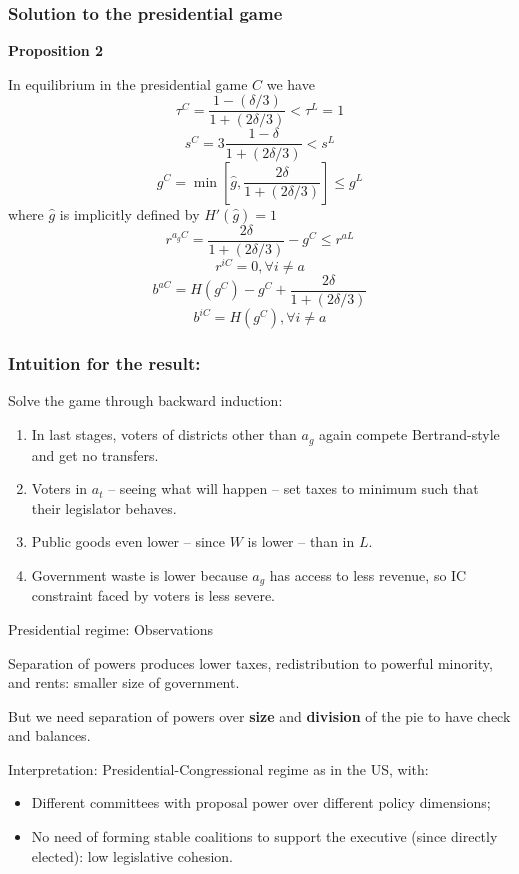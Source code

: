 \documentclass[11pt,aspectratio=169]{beamer}
\begin{document}
\begin{frame}
\frametitle{Solution to the presidential game}

\footnotesize
\noindent \textbf{Proposition 2}

\noindent In equilibrium in the presidential game $C$ we have $$\tau^C=\frac{1-(\delta/3)}{1+(2\delta/3)}<\tau^L=1$$ $$s^C=3\frac{1-\delta}{1+(2\delta/3)}<s^L$$ $$g^C=\min \left[ \hat{g},\frac{2\delta}{1+(2\delta/3)} \right] \leq g^L$$ where $\hat{g}$ is implicitly defined by $H'(\hat{g})=1$ $$r^{a_g C}=\frac{2\delta}{1+(2\delta/3)}-g^C\leq r^{aL}$$ $$r^{iC}=0, \forall i\neq a$$ $$b^{aC}=H(g^C)-g^C+\frac{2\delta}{1+(2\delta/3)}$$ $$b^{iC}=H(g^C), \forall i\neq a$$

\end{frame}

\begin{frame}
\frametitle{Intuition for the result:}

Solve the game through backward induction:

\begin{enumerate}
\item In last stages, voters of districts other than $a_g$ again compete Bertrand-style and get no transfers.
\item Voters in $a_t$ -- seeing what will happen -- set taxes to minimum such that their legislator behaves. 
\item Public goods even lower -- since $W$ is lower -- than in $L$. 
\item Government waste is lower because $a_g$ has access to less revenue, so IC constraint faced by voters is less severe.
\end{enumerate}

\end{frame}

\begin{frame}{Presidential regime: Observations}

\noindent Separation of powers produces lower taxes, redistribution to powerful minority, and rents: smaller size of government.

\medskip

\noindent But we need separation of powers over \textbf{size} and \textbf{division} of the pie to have check and balances.

\medskip

\noindent Interpretation: Presidential-Congressional regime as in the US, with:
\begin{itemize}
\item Different committees with proposal power over different policy dimensions;
\item No need of forming stable coalitions to support the executive (since directly elected): low legislative cohesion. 
\end{itemize}
\end{frame}
\end{document}
